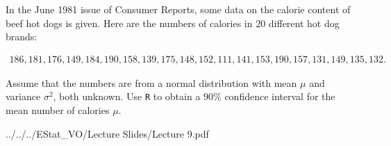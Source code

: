 
\begin{exercise}

In the June 1981 issue of Consumer Reports, some data on the calorie content of beef hot dogs is given.
Here are the numbers of calories in $20$ different hot dog brands:

\begin{align*}
    186, 181, 176, 149, 184, 190, 158, 139, 175, 148, 152, 111, 141, 153, 190, 157, 131, 149, 135, 132.
\end{align*}

Assume that the numbers are from a normal distribution with mean $\mu$ and variance $\sigma^2$, both unknown.
Use \texttt R to obtain a $90 \%$ confidence interval for the mean number of calories $\mu$.

\end{exercise}


\begin{solution}

\phantom{}


{../../../EStat_VO/Lecture Slides/Lecture 9.pdf}



\end{solution}

